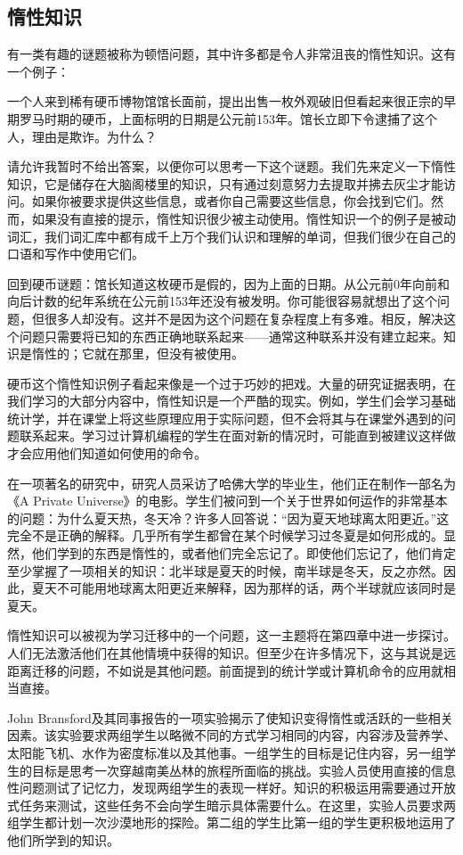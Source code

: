 \subsection*{惰性知识}

有一类有趣的谜题被称为顿悟问题，其中许多都是令人非常沮丧的惰性知识。这有一个例子：

一个人来到稀有硬币博物馆馆长面前，提出出售一枚外观破旧但看起来很正宗的早期罗马时期的硬币，上面标明的日期是公元前153年。馆长立即下令逮捕了这个人，理由是欺诈。为什么？

请允许我暂时不给出答案，以便你可以思考一下这个谜题。我们先来定义一下惰性知识，它是储存在大脑阁楼里的知识，只有通过刻意努力去提取并拂去灰尘才能访问。如果你被要求提供这些信息，或者你自己需要这些信息，你会找到它们。然而，如果没有直接的提示，惰性知识很少被主动使用。惰性知识一个的例子是被动词汇，我们词汇库中都有成千上万个我们认识和理解的单词，但我们很少在自己的口语和写作中使用它们。

回到硬币谜题：馆长知道这枚硬币是假的，因为上面的日期。从公元前0年向前和向后计数的纪年系统在公元前153年还没有被发明。你可能很容易就想出了这个问题，但很多人却没有。这并不是因为这个问题在复杂程度上有多难。相反，解决这个问题只需要将已知的东西正确地联系起来——通常这种联系并没有建立起来。知识是惰性的；它就在那里，但没有被使用。

硬币这个惰性知识例子看起来像是一个过于巧妙的把戏。大量的研究证据表明，在我们学习的大部分内容中，惰性知识是一个严酷的现实。例如，学生们会学习基础统计学，并在课堂上将这些原理应用于实际问题，但不会将其与在课堂外遇到的问题联系起来。学习过计算机编程的学生在面对新的情况时，可能直到被建议这样做才会应用他们知道如何使用的命令。

在一项著名的研究中，研究人员采访了哈佛大学的毕业生，他们正在制作一部名为《A Private Universe》的电影。学生们被问到一个关于世界如何运作的非常基本的问题：为什么夏天热，冬天冷？许多人回答说：“因为夏天地球离太阳更近。”这完全不是正确的解释。几乎所有学生都曾在某个时候学习过冬夏是如何形成的。显然，他们学到的东西是惰性的，或者他们完全忘记了。即使他们忘记了，他们肯定至少掌握了一项相关的知识：北半球是夏天的时候，南半球是冬天，反之亦然。因此，夏天不可能用地球离太阳更近来解释，因为那样的话，两个半球就应该同时是夏天。

惰性知识可以被视为学习迁移中的一个问题，这一主题将在第四章中进一步探讨。人们无法激活他们在其他情境中获得的知识。但至少在许多情况下，这与其说是远距离迁移的问题，不如说是其他问题。前面提到的统计学或计算机命令的应用就相当直接。

John Bransford及其同事报告的一项实验揭示了使知识变得惰性或活跃的一些相关因素。该实验要求两组学生以略微不同的方式学习相同的内容，内容涉及营养学、太阳能飞机、水作为密度标准以及其他事。一组学生的目标是记住内容，另一组学生的目标是思考一次穿越南美丛林的旅程所面临的挑战。实验人员使用直接的信息性问题测试了记忆力，发现两组学生的表现一样好。知识的积极运用需要通过开放式任务来测试，这些任务不会向学生暗示具体需要什么。在这里，实验人员要求两组学生都计划一次沙漠地形的探险。第二组的学生比第一组的学生更积极地运用了他们所学到的知识。

